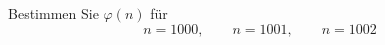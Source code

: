 \begin{aufgabe}
Bestimmen Sie $\varphi(n)$ für
\[
n = 1000, \qquad n = 1001, \qquad n = 1002
\]
\end{aufgabe}
